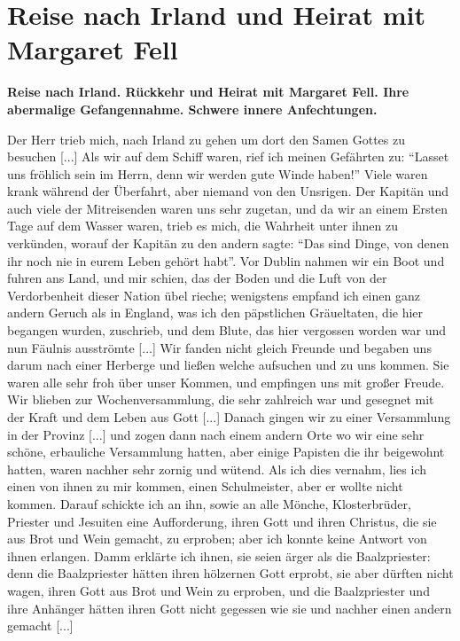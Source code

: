 \chapter[Reise nach Irland und Heirat mit Margaret Fell]{Reise 
nach Irland und Heirat mit Margaret Fell}

\begin{center}
\textbf{Reise nach Irland. Rückkehr und Heirat mit Margaret Fell.
Ihre abermalige Gefangennahme. Schwere innere Anfechtungen.}
\end{center}

Der Herr trieb mich, nach Irland zu gehen um dort den
Samen Gottes zu besuchen [...] Als wir auf dem Schiff
waren, rief ich meinen Gefährten zu: "`Lasset uns fröhlich sein
im Herrn, denn wir werden gute Winde haben!"' Viele waren
krank während der Überfahrt, aber niemand von den Unsrigen.
Der Kapitän und auch viele der Mitreisenden waren uns sehr
zugetan, und da wir an einem Ersten Tage auf dem Wasser
waren, trieb es mich, die Wahrheit unter ihnen zu verkünden,
worauf der Kapitän zu den andern sagte: "`Das sind Dinge, von
denen ihr noch nie in eurem Leben gehört habt"'. Vor Dublin
nahmen wir ein Boot und fuhren ans Land, und mir schien, das
der Boden und die Luft von der Verdorbenheit dieser Nation
übel rieche; wenigstens empfand ich einen ganz andern Geruch als
in England, was ich den päpstlichen Gräueltaten, die hier 
begangen wurden, zuschrieb, und dem Blute, das hier vergossen
worden war und nun Fäulnis ausströmte [...] Wir fanden
nicht gleich Freunde und begaben uns darum nach einer Herberge
und ließen welche aufsuchen und zu uns kommen. Sie waren
alle sehr froh über unser Kommen, und empfingen uns mit großer
Freude. Wir blieben zur Wochenversammlung, 
die sehr zahlreich war und gesegnet mit der Kraft und dem Leben aus 
Gott [...] Danach gingen wir zu einer Versammlung in der Provinz [...]
und zogen dann nach einem andern Orte wo wir eine sehr schöne,
erbauliche Versammlung hatten, aber einige Papisten die ihr
beigewohnt hatten, waren nachher sehr zornig und wütend. Als
ich dies vernahm, lies ich einen von ihnen zu mir kommen, einen
Schulmeister, aber er wollte nicht kommen. Darauf schickte ich
an ihn, sowie an alle Mönche, Klosterbrüder, Priester und Jesuiten
eine Aufforderung, ihren Gott und ihren Christus, die sie aus
Brot und Wein gemacht, zu erproben; aber ich konnte keine
Antwort von ihnen erlangen. Damm erklärte ich ihnen, sie seien
ärger als die Baalzpriester: denn die 
Baalzpriester hätten ihren hölzernen Gott erprobt, sie aber 
dürften nicht wagen, ihren Gott aus Brot und Wein zu erproben, und die Baalzpriester und ihre
Anhänger hätten ihren Gott nicht gegessen wie sie und nachher
einen andern gemacht [...]

